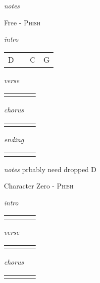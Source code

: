 \documentclass[12pt]{article}
\begin{document}
\textit{notes}

\newpage

{\Huge Free} {\huge - \textsc{Phish}}

\huge
\textit{intro}

\begin{tabular}{|P{1.25in}|P{1.25in}|P{1.25in}|P{1.25in}|}
  D  &   &  C & G \\
\end{tabular}

\textit{verse}

\begin{tabular}{|P{1.25in}|P{1.25in}|P{1.25in}|P{1.25in}|}
    &   &   &   \\
\end{tabular}

\textit{chorus}

\begin{tabular}{|P{1.25in}|P{1.25in}|P{1.25in}|P{1.25in}|}
    &   &   &   \\
\end{tabular}

\textit{ending}

\begin{tabular}{|P{1.25in}|P{1.25in}|P{1.25in}|P{1.25in}|}
    &   &   &   \\
\end{tabular}

\textit{notes}
prbably need dropped D
\newpage

{\Huge Character Zero} {\huge - \textsc{Phish}}

\huge
\textit{intro}

\begin{tabular}{|P{1.25in}|P{1.25in}|P{1.25in}|P{1.25in}|}
    &   &   &   \\
\end{tabular}

\textit{verse}

\begin{tabular}{|P{1.25in}|P{1.25in}|P{1.25in}|P{1.25in}|}
    &   &   &   \\
\end{tabular}

\textit{chorus}

\begin{tabular}{|P{1.25in}|P{1.25in}|P{1.25in}|P{1.25in}|}
    &   &   &   \\
\end{tabular}
\end{document}
